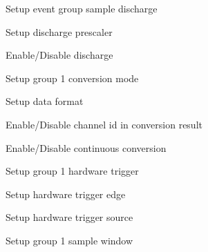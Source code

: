 \begin{DoxyItemize}
\item Setup event group sample discharge
\begin{DoxyItemize}
\item Setup discharge prescaler
\item Enable/\+Disable discharge
\end{DoxyItemize}
\item Setup group 1 conversion mode
\begin{DoxyItemize}
\item Setup data format
\item Enable/\+Disable channel id in conversion result
\item Enable/\+Disable continuous conversion
\end{DoxyItemize}
\item Setup group 1 hardware trigger
\begin{DoxyItemize}
\item Setup hardware trigger edge
\item Setup hardware trigger source
\end{DoxyItemize}
\item Setup group 1 sample window ~\newline
~\newline
~\newline
~\newline
~\newline
~\newline
~\newline
~\newline
~\newline
~\newline
~\newline
~\newline
~\newline


\end{DoxyItemize}
